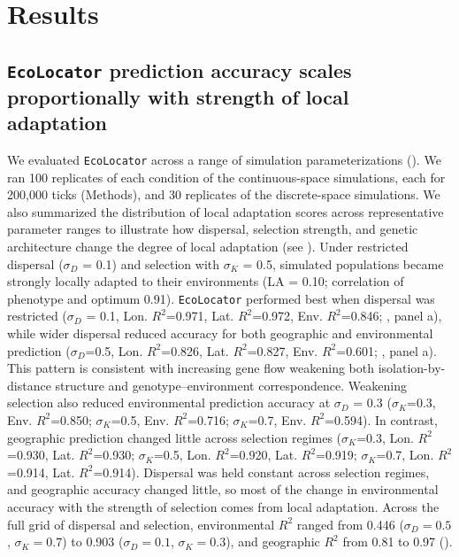 \documentclass[]{article}
\newcommand{\ecolocator}{\texttt{EcoLocator}\xspace}
\begin{document}
\section{Results}

\subsection{\ecolocator prediction accuracy scales proportionally
with strength of local adaptation}

We evaluated \ecolocator
across a range of simulation parameterizations ().
We ran 100 replicates of each condition of the continuous-space simulations,
each for 200,000 ticks (Methods),
and 30 replicates of the discrete-space simulations.
We also summarized
the distribution of local adaptation scores
across representative parameter ranges to illustrate
how dispersal, selection strength, and genetic architecture
change the degree of local adaptation (see ).
Under restricted dispersal (\(\sigma_D\) = 0.1) and
selection with \(\sigma_K\) = 0.5,
simulated populations became strongly locally adapted
to their environments
(LA = 0.10; correlation of phenotype and optimum 0.91).
\ecolocator performed best when dispersal was restricted
(\(\sigma_D\) = 0.1, Lon. $R^2$=0.971, Lat. $R^2$=0.972, Env. $R^2$=0.846;
, panel a),
while wider dispersal reduced accuracy
for both geographic and environmental prediction
(\(\sigma_D\)=0.5, Lon. $R^2$=0.826, Lat. $R^2$=0.827, Env. $R^2$=0.601;
, panel a).
This pattern is consistent with increasing gene flow weakening both
isolation-by-distance structure and genotype--environment correspondence.
Weakening selection also reduced environmental prediction accuracy
at \(\sigma_D\) = 0.3
(\(\sigma_K\)=0.3, Env. $R^2$=0.850;
\(\sigma_K\)=0.5, Env. $R^2$=0.716;
\(\sigma_K\)=0.7, Env. $R^2$=0.594).
In contrast, geographic prediction changed little
across selection regimes
(\(\sigma_K\)=0.3, Lon. $R^2$=0.930, Lat. $R^2$=0.930;
 \(\sigma_K\)=0.5, Lon. $R^2$=0.920, Lat. $R^2$=0.919;
 \(\sigma_K\)=0.7, Lon. $R^2$=0.914, Lat. $R^2$=0.914).
Dispersal was held constant across selection regimes,
and geographic accuracy changed little,
so most of the change in environmental accuracy
with the strength of selection comes from local adaptation.
Across the full grid of dispersal and selection,
environmental $R^2$ ranged from 0.446 ($\sigma_D = 0.5$, $\sigma_K = 0.7$)
to 0.903 ($\sigma_D = 0.1$, $\sigma_K = 0.3$),
and geographic $R^2$ from 0.81 to 0.97 ().
\end{document}
